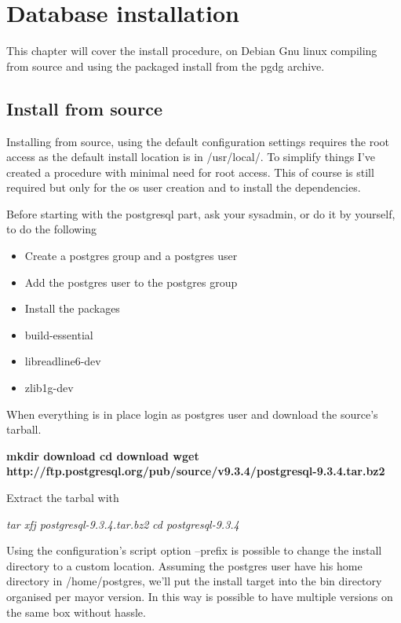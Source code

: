 \chapter{Database installation}
\label{cha:DB_INSTALL}
This chapter will cover the install procedure, on Debian Gnu linux compiling from source and using the packaged install from the pgdg archive.

\section{Install from source}
Installing from source, using the default configuration settings requires the root access as the default install location is in /usr/local/. 
To simplify things I've created a procedure with minimal need for root access.
This of course is still required but only for the os user creation and to install the dependencies. 

Before starting with the postgresql part, ask your sysadmin, or do it by yourself, to do the following

\begin{itemize}

 \item Create a postgres group and a postgres user
 \item Add the postgres user to the postgres group
 \item Install the packages
 \item build-essential
 \item libreadline6-dev
 \item zlib1g-dev
 
\end{itemize}


When everything is in place login as postgres user and download the source's tarball.

\textbf{
mkdir download
cd download
wget http://ftp.postgresql.org/pub/source/v9.3.4/postgresql-9.3.4.tar.bz2
}

Extract the tarbal with

\textit{tar xfj postgresql-9.3.4.tar.bz2} 
\textit{cd postgresql-9.3.4}

Using the configuration’s script option --prefix is possible to change 
the install directory to a custom location.
Assuming the postgres user have his home directory in /home/postgres, we'll put 
the install target into the bin directory organised per
mayor version. In this way  is possible to have multiple versions on the same 
box without hassle.

